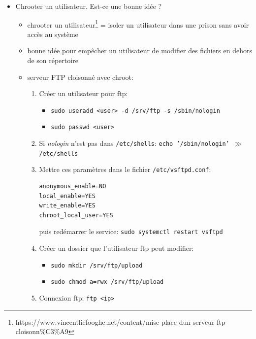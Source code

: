 \documentclass[a4paper]{article}
\begin{document}
\begin{itemize}
\item Chrooter un utilisateur. Est-ce une bonne idée ?
\begin{example}
    \begin{itemize}
        \item chrooter un utilisateur\footnote{https://www.vincentliefooghe.net/content/mise-place-dun-serveur-ftp-cloisonn\%C3\%A9} = isoler un utilisateur dans une prison sans avoir accès au système
        \item bonne idée pour empêcher un utilisateur de modifier des fichiers en dehors de son répertoire
        \item serveur FTP cloisonné avec chroot:
        \begin{enumerate}
            \item Créer un utilisateur pour ftp:
            \begin{itemize}
                \item \texttt{sudo useradd <user> -d /srv/ftp -s /sbin/nologin}
                \item \texttt{sudo passwd <user>}
            \end{itemize}
            \item Si \textit{nologin} n'est pas dans \texttt{/etc/shells}: \texttt{echo '/sbin/nologin' $\gg$ /etc/shells}
            \item Mettre ces paramètres dans le fichier \texttt{/etc/vsftpd.conf}:
            \begin{verbatim}
anonymous_enable=NO
local_enable=YES
write_enable=YES
chroot_local_user=YES
            \end{verbatim}
            puis redémarrer le service: \texttt{sudo systemctl restart vsftpd}
            \item Créer un dossier que l'utilisateur ftp peut modifier:
            \begin{itemize}
                \item \texttt{sudo mkdir /srv/ftp/upload}
                \item \texttt{sudo chmod a=rwx /srv/ftp/upload}
            \end{itemize}
            \item Connexion ftp: \texttt{ftp <ip>}
        \end{enumerate}
    \end{itemize}
\end{example}


\end{itemize}
\end{document}
